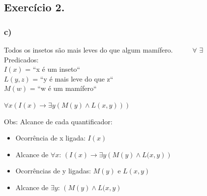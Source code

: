 \documentclass[11pt]{report}
\begin{document}
    \subsection*{Exercício 2.}
    \subsubsection*{c)}
    \color{red} Todos \color{black} os insetos são mais leves do que \color{red} algum \color{black} mamífero.~~~~~\color{red} $\forall$ $\exists$\\
    \color{black} Predicados:\\
    $I(x)$ = ``x é um inseto``\\
    $L(y,z)$ = ``y é mais leve do que z``\\
    $M(w)$ = ``w é um mamífero``\\
    \par $\forall x \left(I(x) \rightarrow \exists y \left( M(y) \wedge L(x, y) \right) \right)$
    \par Obs: Alcance de cada quantificador:\\
    \begin{itemize}
        \item Ocorrência de x ligada: $I(x)$
        \item Alcance de $\forall x$: $\left(I(x) \rightarrow \exists y \left( M(y) \wedge L(x, y \right) \right)$
        \item Ocorrências de y ligadas: $M(y)$ e $L(x, y)$
        \item Alcance de $\exists y$: $\left( M(y) \wedge L(x, y \right)$
    \end{itemize}
    
    
\end{document}
